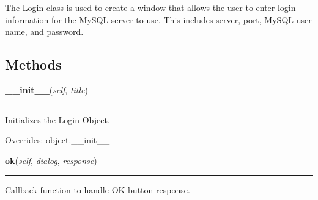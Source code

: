 The Login class is used to create a window that allows the user to enter 
login information for the MySQL server to use.  This includes server, port,
MySQL user name, and password.



  \subsection{Methods}

    \vspace{0.5ex}

\hspace{.8\funcindent}\begin{boxedminipage}{\funcwidth}

    \raggedright \textbf{\_\_init\_\_}(\textit{self}, \textit{title})

    \vspace{-1.5ex}

    \rule{\textwidth}{0.5\fboxrule}
\setlength{\parskip}{2ex}
    Initializes the Login Object.

\setlength{\parskip}{1ex}
      Overrides: object.\_\_init\_\_

    \end{boxedminipage}

    \label{reliafree:login:Login:ok}

    \vspace{0.5ex}

\hspace{.8\funcindent}\begin{boxedminipage}{\funcwidth}

    \raggedright \textbf{ok}(\textit{self}, \textit{dialog}, \textit{response})

    \vspace{-1.5ex}

    \rule{\textwidth}{0.5\fboxrule}
\setlength{\parskip}{2ex}
    Callback function to handle OK button response.

\setlength{\parskip}{1ex}
    \end{boxedminipage}

    \label{reliafree:login:Login:cancel}

